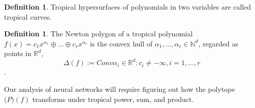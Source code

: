 \documentclass{article}
\theoremstyle{definition}
\newtheorem{definition}[theorem]{Definition}
\newtheorem{comment}[theorem]{Comment}
\begin{document}
\begin{definition}\cite[p.~3]{zhang2018tropical}
Tropical hypersurfaces of polynomials in two variables are called tropical curves.
\end{definition}

\begin{definition}\cite[p.~3]{zhang2018tropical}
The Newton polygon of a tropical polynomial $f(x) = c_1 x^{\alpha_1} \oplus \dots \oplus c_r x^{\alpha_r}$  is the convex hull of $\alpha_1 , \dots , \alpha_r \in \mathbb{N}^{d}$, regarded as points in $\mathbb{R}^{d}$,
$$ \Delta(f) := Conv{\alpha_i \in \mathbb{R}^{d} : c_i \neq -\infty , i = 1, \dots ,r } $$.
\end{definition}

Our analysis of neural networks will require figuring out
how the polytope $\mathcal(P)(f)$ transforms under tropical power,
sum, and product.
\end{document}
